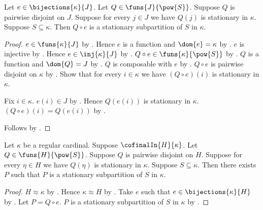 \begin{theorem}\label{stationary_subpartition_reindex_bijection}
    Let $e\in\bijections{\kappa}{J}$.
    Let $Q\in\funs{J}{\pow{S}}$.
    Suppose $Q$ is pairwise disjoint on $J$.
    Suppose for every $j\in J$ we have $Q(j)$ is stationary in $\kappa$.
    Suppose $S\subseteq\kappa$.
    Then $Q\circ e$ is a stationary subpartition of $S$ in $\kappa$.
\end{theorem}
\begin{proof}
    $e\in\funs{\kappa}{J}$ by .
    Hence $e$ is a function and $\dom{e}=\kappa$
        by .
    $e$ is injective by .
    Hence $e\in\inj{\kappa}{J}$
        by .
    $Q\circ e\in\funs{\kappa}{\pow{S}}$ by .
    $Q$ is a function and $\dom{Q}=J$
        by .
    $Q$ is composable with $e$ by .
    $Q\circ e$ is pairwise disjoint on $\kappa$
        by .
    Show that for every $i\in\kappa$ we have
        $(Q\circ e)(i)$ is stationary in $\kappa$.
    \begin{subproof}
        Fix $i\in\kappa$.
        $e(i)\in J$ by .
        Hence $Q(e(i))$ is stationary in $\kappa$.
        $(Q\circ e)(i)=Q(e(i))$ by .
    \end{subproof}
    Follows by .
\end{proof}

\begin{theorem}\label{cofinal_stationary_cells_to_subpartition}
    Let $\kappa$ be a regular cardinal.
    Suppose $\cofinalIn{H}{\kappa}$.
    Let $Q\in\funs{H}{\pow{S}}$.
    Suppose $Q$ is pairwise disjoint on $H$.
    Suppose for every $\eta\in H$ we have
        $Q(\eta)$ is stationary in $\kappa$.
    Suppose $S\subseteq\kappa$.
    Then there exists $P$ such that
        $P$ is a stationary subpartition of $S$ in $\kappa$.
\end{theorem}
\begin{proof}
    $H\approx\kappa$
        by .
    Hence $\kappa\approx H$ by .
    Take $e$ such that $e\in\bijections{\kappa}{H}$
        by .
    Let $P=Q\circ e$.
    $P$ is a stationary subpartition of $S$ in $\kappa$
        by .
\end{proof}

